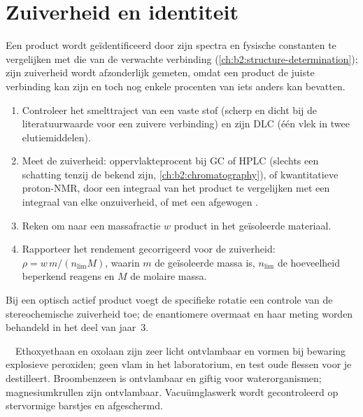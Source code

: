 \section{Zuiverheid en identiteit}

Een product wordt geïdentificeerd door zijn spectra en fysische constanten te vergelijken met die van de verwachte
verbinding (\cref{ch:b2:structure-determination}); zijn zuiverheid wordt afzonderlijk gemeten, omdat een product
de juiste verbinding kan zijn en toch nog enkele procenten van iets anders kan bevatten.

\begin{method}\label{met:b2:lab-techniques-2:purity}
\begin{enumerate}
  \item Controleer het smelttraject van een vaste stof (scherp en dicht bij de literatuurwaarde voor een zuivere
        verbinding) en zijn DLC (één vlek in twee elutiemiddelen).
  \item Meet de zuiverheid: oppervlakteprocent bij GC of HPLC (slechts een schatting tenzij de  bekend zijn,
        \cref{ch:b2:chromatography}), of kwantitatieve proton-NMR, door een integraal van het product te vergelijken
        met een integraal van elke onzuiverheid, of met een afgewogen .
  \item Reken om naar een massafractie $w$ product in het geïsoleerde materiaal.
  \item Rapporteer het rendement gecorrigeerd voor de zuiverheid: $\rho = w\,m/(n_{\mathrm{lim}}M)$, waarin $m$ de
        geïsoleerde massa is, $n_{\mathrm{lim}}$ de hoeveelheid beperkend reagens en $M$ de molaire massa.
\end{enumerate}
\end{method}

Bij een optisch actief product voegt de specifieke rotatie een controle van de stereochemische zuiverheid toe;
de enantiomere overmaat en haar meting worden behandeld in het deel van jaar~3.

\begin{safety}{\,\,\,\,}
Ethoxyethaan en oxolaan zijn zeer licht ontvlambaar en vormen bij bewaring explosieve peroxiden; geen vlam in
het laboratorium, en test oude flessen voor je destilleert. Broombenzeen is ontvlambaar en giftig voor waterorganismen;
magnesiumkrullen zijn ontvlambaar. Vacuümglaswerk wordt gecontroleerd op stervormige barstjes en afgeschermd.
\end{safety}

